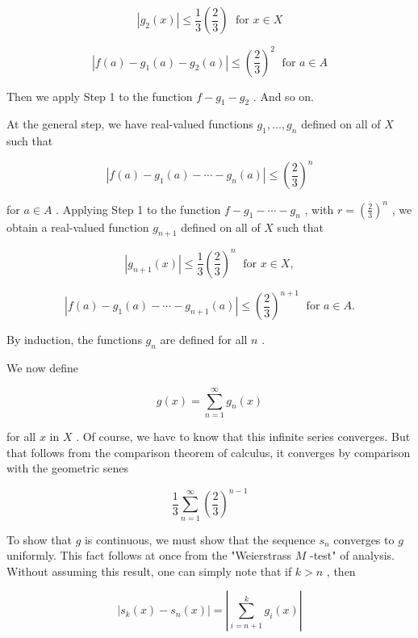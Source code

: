 \documentclass[10pt]{article}
\begin{document}
\[
\left| {{g}_{2}\left( x\right) }\right|  \leq  \frac{1}{3}\left( \frac{2}{3}\right) \;\text{ for }x \in  X
\]

\[
\left| {f\left( a\right)  - {g}_{1}\left( a\right)  - {g}_{2}\left( a\right) }\right|  \leq  {\left( \frac{2}{3}\right) }^{2}\;\text{ for }a \in  A
\]

Then we apply Step 1 to the function \(f - {g}_{1} - {g}_{2}\) . And so on.

At the general step, we have real-valued functions \({g}_{1},\ldots ,{g}_{n}\) defined on all of \(X\) such that

\[
\left| {f\left( a\right)  - {g}_{1}\left( a\right)  - \cdots  - {g}_{n}\left( a\right) }\right|  \leq  {\left( \frac{2}{3}\right) }^{n}
\]

for \(a \in  A\) . Applying Step 1 to the function \(f - {g}_{1} - \cdots  - {g}_{n}\) , with \(r = {\left( \frac{2}{3}\right) }^{n}\) , we obtain a real-valued function \({g}_{n + 1}\) defined on all of \(X\) such that

\[
\left| {{g}_{n + 1}\left( x\right) }\right|  \leq  \frac{1}{3}{\left( \frac{2}{3}\right) }^{n}\;\text{ for }x \in  X,
\]

\[
\left| {f\left( a\right)  - {g}_{1}\left( a\right)  - \cdots  - {g}_{n + 1}\left( a\right) }\right|  \leq  {\left( \frac{2}{3}\right) }^{n + 1}\;\text{ for }a \in  A.
\]

By induction, the functions \({g}_{n}\) are defined for all \(n\) .

We now define

\[
g\left( x\right)  = \mathop{\sum }\limits_{{n = 1}}^{\infty }{g}_{n}\left( x\right)
\]

for all \(x\) in \(X\) . Of course, we have to know that this infinite series converges. But that follows from the comparison theorem of calculus, it converges by comparison with the geometric senes

\[
\frac{1}{3}\mathop{\sum }\limits_{{n = 1}}^{\infty }{\left( \frac{2}{3}\right) }^{n - 1}
\]

To show that \(g\) is continuous, we must show that the sequence \({s}_{n}\) converges to \(g\) uniformly. This fact follows at once from the "Weierstrass \(M\) -test" of analysis. Without assuming this result, one can simply note that if \(k > n\) , then

\[
\left| {{s}_{k}\left( x\right)  - {s}_{n}\left( x\right) }\right|  = \left| {\mathop{\sum }\limits_{{i = n + 1}}^{k}{g}_{i}\left( x\right) }\right|
\]
\end{document}

